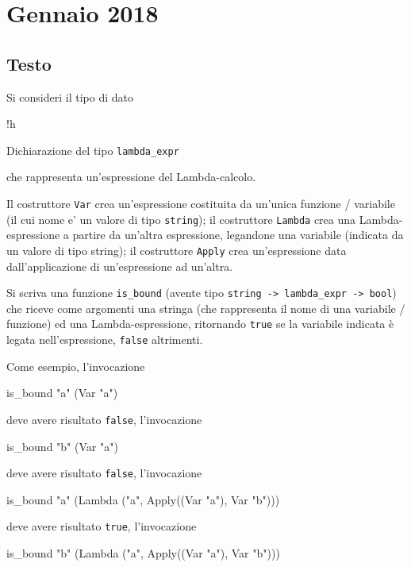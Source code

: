 \section{Gennaio 2018}

\subsection*{Testo}

Si consideri il tipo di dato

\begin{listing}{!h}
\caption{Dichiarazione del tipo \texttt{lambda_expr}}
\end{listing}

che rappresenta un'espressione del Lambda-calcolo.

Il costruttore \texttt{Var} crea un'espressione costituita da un'unica funzione / variabile (il cui nome e' un valore di tipo \texttt{string});
il costruttore \texttt{Lambda} crea una Lambda-espressione a partire da un'altra espressione, legandone una variabile (indicata da un valore di tipo string);
il costruttore \texttt{Apply} crea un'espressione data dall'applicazione di un'espressione ad un'altra.

Si scriva una funzione \texttt{is_bound} (avente tipo \texttt{string -> lambda_expr -> bool}) che riceve come argomenti una stringa (che rappresenta il nome di una variabile / funzione) ed una Lambda-espressione,
ritornando \texttt{true} se la variabile indicata è legata nell'espressione, \texttt{false} altrimenti.

\medskip
Come esempio, l'invocazione

\begin{smlcode}
is_bound "a" (Var "a")
\end{smlcode}

deve avere risultato \texttt{false}, l'invocazione

\begin{smlcode}
is_bound "b" (Var "a")
\end{smlcode}

deve avere risultato \texttt{false}, l'invocazione

\begin{smlcode}
is_bound "a" (Lambda ("a", Apply((Var "a"), Var "b")))
\end{smlcode}

deve avere risultato \texttt{true}, l'invocazione

\begin{smlcode}
is_bound "b" (Lambda ("a", Apply((Var "a"), Var "b")))
\end{smlcode}

